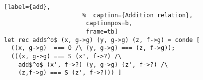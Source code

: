 \begin{figure}[!t]
  \centering
  \begin{minipage}{\columnwidth}
    \begin{lstlisting}[label={add},
                      %  caption={Addition relation},
                       captionpos=b,
                       frame=tb]
let rec add$^o$ (x, g->g) (y, g->g) (z, f->g) = conde [
  ((x, g->g)  === O /\ (y, g->g) === (z, f->g));
  (((x, g->g) === S (x', f->?) /\
    add$^o$ (x', f->?) (y, g->g) (z', f->?) /\
    (z,f->g) === S (z', f->?))) ]
    \end{lstlisting}
  \end{minipage}
\end{figure}